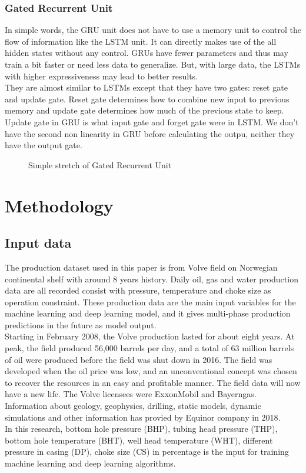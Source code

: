 \documentclass[english]{article}
\makeatletter
\def\maxwidth{\ifdim\Gin@nat@width>\linewidth\linewidth
    \else\Gin@nat@width\fi}
\let\Oldincludegraphics\includegraphics
\renewcommand{\includegraphics}[1]{\Oldincludegraphics[width=.8\maxwidth]{#1}}
\makeatother
\begin{document}
\subsubsection{Gated Recurrent Unit}
In simple words, the GRU unit does not have to use a memory unit to control the flow of information like the LSTM unit. It can directly makes use of the all hidden states without any control. GRUs have fewer parameters and thus may train a bit faster or need less data to generalize. But, with large data, the LSTMs with higher expressiveness may lead to better results.\\
They are almost similar to LSTMs except that they have two gates: reset gate and update gate. Reset gate determines how to combine new input to previous memory and update gate determines how much of the previous state to keep. Update gate in GRU is what input gate and forget gate were in LSTM. We don't have the second non linearity in GRU before calculating the outpu, neither they have the output gate.
\begin{figure}[H]
  \centering
  \caption{Simple stretch of Gated Recurrent Unit\cite{LSTM}}
\end{figure}




\clearpage
\section{Methodology}
\subsection{Input data}
The production dataset used in this paper is from Volve field on Norwegian continental shelf with around 8 years history. Daily oil, gas and water production data are all recorded consist with pressure, temperature and choke size as operation constraint. These production data are the main input variables for the machine learning and deep learning model, and it gives multi-phase production predictions in the future as model output.\\
Starting in February 2008, the Volve production lasted for about eight years. At peak, the field produced 56,000 barrels per day, and a total of 63 million barrels of oil were produced before the field was shut down in 2016. The field was developed when the oil price was low, and an unconventional concept was chosen to recover the resources in an easy and profitable manner. The field data will now have a new life. The Volve licensees were ExxonMobil and Bayerngas. Information about geology, geophysics, drilling, static models, dynamic simulations and other information has provied by Equinor company in 2018\cite{Volve}.\\
In this research, bottom hole pressure (BHP), tubing head pressure (THP), bottom hole temperature (BHT), well head temperature (WHT), different pressure in casing (DP), choke size (CS) in percentage is the input for training machine learning and deep learning algorithms.
\end{document}
